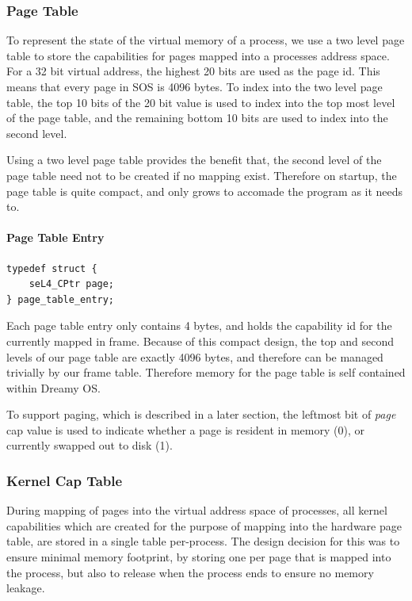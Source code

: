 \documentclass[runningheads,a4paper]{llncs}
\begin{document}
\subsubsection{Page Table}

To represent the state of the virtual memory of a process, we use a two level page table to store the capabilities for pages mapped into a processes address space. For a 32 bit virtual address, the highest 20 bits are used as the page id. This means that every page in SOS is 4096 bytes. To index into the two level page table, the top 10 bits of the 20 bit value is used to index into the top most level of the page table, and the remaining bottom 10 bits are used to index into the second level.

Using a two level page table provides the benefit that, the second level of the page table need not to be created if no mapping exist. Therefore on startup, the page table is quite compact, and only grows to accomade the program as it needs to.

\paragraph{Page Table Entry}

\begin{lstlisting}[style=CStyle]
typedef struct {
    seL4_CPtr page; 
} page_table_entry;
\end{lstlisting}

Each page table entry only contains 4 bytes, and holds the capability id for the currently mapped in frame. Because of this compact design, the top and second levels of our page table are exactly 4096 bytes, and therefore can be managed trivially by our frame table. Therefore memory for the page table is self contained within Dreamy OS.

To support paging, which is described in a later section, the leftmost bit of \textit{page} cap value is used to indicate whether a page is resident in memory (0), or currently swapped out to disk (1).

\subsubsection{Kernel Cap Table}
During mapping of pages into the virtual address space of processes, all kernel capabilities which are created for the purpose of mapping into the hardware page table, are stored in a single table per-process. The design decision for this was to ensure minimal memory footprint, by storing one per page that is mapped into the process, but also to release when the process ends to ensure no memory leakage.
\end{document}
